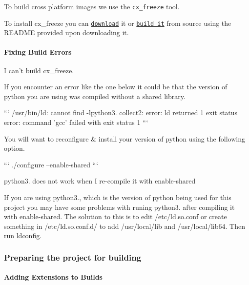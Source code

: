 To build cross platform images we use the \href{http://cx-freeze.sourceforge.net/}{\tt cx\+\_\+freeze} tool.

To install cx\+\_\+freeze you can \href{http://cx-freeze.sourceforge.net/index.html}{\tt download} it or \href{http://cx-freeze.sourceforge.net/index.html}{\tt build it} from source using the R\+E\+A\+D\+M\+E provided upon downloading it.

\paragraph*{Fixing Build Errors}


\begin{DoxyItemize}
\item I can't build cx\+\_\+freeze.
\end{DoxyItemize}

If you encounter an error like the one below it could be that the version of python you are using was compiled without a shared library.

``` /usr/bin/ld\+: cannot find -\/lpython3. collect2\+: error\+: ld returned 1 exit status error\+: command 'gcc' failed with exit status 1 ```

You will want to reconfigure \& install your version of python using the following option.

``` ./configure --enable-\/shared ```


\begin{DoxyItemize}
\item python3. does not work when I re-\/compile it with enable-\/shared
\end{DoxyItemize}

If you are using python3., which is the version of python being used for this project you may have some problems with runing python3. after compiling it with enable-\/shared. The solution to this is to edit /etc/ld.so.\+conf or create something in /etc/ld.so.\+conf.\+d/ to add /usr/local/lib and /usr/local/lib64. Then run ldconfig.

\subsubsection*{Preparing the project for building}

\paragraph*{Adding Extensions to Builds}

